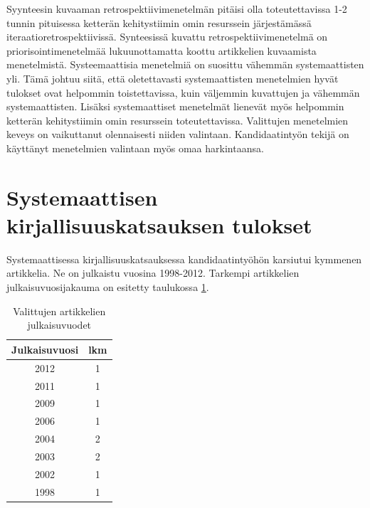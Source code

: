 Syynteesin kuvaaman retrospektiivimenetelmän pitäisi olla toteutettavissa 1-2 tunnin pituisessa ketterän kehitystiimin omin resurssein järjestämässä iteraatioretrospektiivissä. Synteesissä kuvattu retrospektiivimenetelmä on priorisointimenetelmää lukuunottamatta koottu artikkelien kuvaamista menetelmistä. Systeemaattisia menetelmiä on suosittu vähemmän systemaattisten yli. Tämä johtuu siitä, että oletettavasti systemaattisten menetelmien hyvät tulokset ovat helpommin toistettavissa, kuin väljemmin kuvattujen ja vähemmän systemaattisten. Lisäksi systemaattiset menetelmät lienevät myös helpommin ketterän kehitystiimin omin resurssein toteutettavissa. Valittujen menetelmien keveys on vaikuttanut olennaisesti niiden valintaan. Kandidaatintyön tekijä on käyttänyt menetelmien valintaan myös omaa harkintaansa.

\section{Systemaattisen kirjallisuuskatsauksen tulokset}
Systemaattisessa kirjallisuuskatsauksessa kandidaatintyöhön karsiutui kymmenen artikkelia. Ne on julkaistu vuosina 1998-2012. Tarkempi artikkelien julkaisuvuosijakauma on esitetty taulukossa \ref{tab:julkaisuvuodet}.
\begin{table}
    \begin{tabular}{|c|c|}
        \hline
        \textbf{Julkaisuvuosi} & \textbf{lkm} \\ \hline
	2012	& 1 \\ \hline
	2011	& 1 \\ \hline
	2009	& 1 \\ \hline
	2006	& 1 \\ \hline
	2004	& 2 \\ \hline
	2003	& 2 \\ \hline
	2002	& 1 \\ \hline
	1998	& 1 \\ \hline
    \end{tabular}
    \caption{Valittujen artikkelien julkaisuvuodet}
    \label{tab:julkaisuvuodet}
\end{table}

